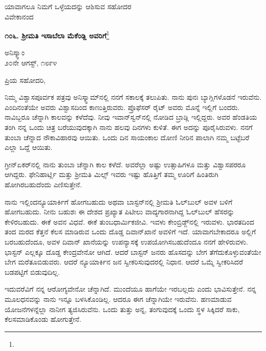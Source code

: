 \vspace{-0.3cm}

{\flushright
ಯಾವಾಗಲೂ ನಿಮಗೆ ಒಳ್ಳೆಯದನ್ನು ಆಶಿಸುವ ಸಹೋದರ\\ವಿವೇಕಾನಂದ\par}

\begin{center}
\textbf{೧೦೬. ಶ‍್ರೀಮತಿ ಇಸಾಬೆಲಾ ಮೆಕೆಂಡ್ಲಿ ಅವರಿಗೆ}\footnote{}
\end{center}

\vspace{-0.5cm}

\begin{flushright}
ಅನಿಸ್ಕ್ವಾಂ\\೨೦ನೇ ಆಗಸ್ಟ್, ೧೮೯೪
\end{flushright}

\vspace{-0.5cm}

\noindent
ಪ್ರಿಯ ಸಹೋದರಿ,

ನಿಮ್ಮ ವಿಶ್ವಾಸಪೂರ್ವಕ ಪತ್ರವು ಅನಿಸ್ಕ್ವಾಮ್‌ನಲ್ಲಿ ನನಗೆ ಸಕಾಲಕ್ಕೆ ತಲುಪಿತು. ನಾನು ಪುನಃ ಬ್ಯಾಗ್ಲಿಗಳೊಡನೆ ಇರುವೆನು. ಎಂದಿನಂತೆಯೇ ಅವರು ವಿಶ್ವಾಸದಿಂದ ಕಾಣುತ್ತಿರುವರು. ಪ್ರೊಫೆಸರ್ ರೈಟ್ ಅವರು ಮೊನ್ನೆ ಇಲ್ಲಿಗೆ ಬಂದರು. ನಾವಿಬ್ಬರೂ ಚೆನ್ನಾಗಿ ಕಾಲವನ್ನು ಕಳೆದೆವು. ನೀವು ಇವಾನ್‌ಸ್ವನ್‌ನಲ್ಲಿ ನೋಡಿದ ಬ್ರಾಡ್ಲಿ ಇಲ್ಲಿದ್ದರು. ಅವರ ಹೆಂಡತಿಯ ತಂಗಿ ನನ್ನ ಒಂದು ಚಿತ್ರ ಬರೆಯುವುದಕ್ಕಾಗಿ ನಾನು ಹಲವು ದಿನಗಳು ಕುಳಿತೆ. ಈಗ ಅದನ್ನು ಪೂರೈಸಿರುವಳು. ನನಗೆ ತುಂಬಾ ಚೆನ್ನಾದ ನೌಕಾವಿಹಾರವು ಆಯಿತು. ಒಂದು ದಿನ ಸಾಯಂಕಾಲ ದೋಣಿ ನೀರಿನ ಪಾಲಾಗಿ ನಮ್ಮ ಬಟ್ಟೆಬರೆ ಎಲ್ಲಾ ಒದ್ದೆ ಆಯಿತು.

ಗ್ರೀನ್‌ಏಕರ್‌ನಲ್ಲಿ ನಾನು ತುಂಬಾ ಚೆನ್ನಾಗಿ ಕಾಲ ಕಳೆದೆ. ಅವರೆಲ್ಲಾ ಅಷ್ಟು ಉತ್ಸಾಹಿಗಳೂ ಮತ್ತು ವಿಶ್ವಾಸಪರರೂ ಆಗಿದ್ದರು. ಫೇನಿಹಾರ್ಟ್ಲಿ ಮತ್ತು ಶ‍್ರೀಮತಿ ಮಿಲ್ಸ್ ಇವರು ಇಷ್ಟು ಹೊತ್ತಿಗೆ ತಮ್ಮ ಊರಿಗೆ ಹಿಂತಿರುಗಿ ಹೋಗಿರಬಹುದೆಂದು ಎಣಿಸುತ್ತೇನೆ.

ನಾನು ಇಲ್ಲಿಂದನ್ಯೂಯಾರ್ಕಿಗೆ ಹೋಗಬಹುದು ಅಥವಾ ಬಾಸ್ಟನ್‌ನಲ್ಲಿ ಶ‍್ರೀಮತಿ ಓಲ್‌ಬುಲ್ ಅವಳ ಬಳಿಗೆ ಹೋಗಬಹುದು. ನೀನು ಬಹುಶಃ ಈ ದೇಶದ ಪ್ರಖ್ಯಾತ ಪಿಟೀಲು ವಾದ್ಯಗಾರನಾಗಿದ್ದ ಓಲ್‌ಬುಲ್ ಹೆಸರನ್ನು ಕೇಳಿರಬಹುದು. ಈಕೆ ಅವನ ವಿಧವೆ. ಈಕೆ ತುಂಬಧಾರ್ಮಿಕಜೀವಿ. ಇವಳು ಕೇಂಬ್ರಿಡ್ಜ್‌ನಲ್ಲಿ ಇರುವಳು. ಭಾರತದಿಂದ ತಂದ ಮರದ ಕೆತ್ತನೆ ಕೆಲಸ ಮಾಡಿರುವ ಒಂದು ದೊಡ್ಡ ದಿವಾನ್‌ಖಾನೆ ಅವಳಿಗೆ ಇದೆ. ಯಾವಾಗಬೇಕಾದರೂ ಅಲ್ಲಿಗೆ ಬರಬಹುದೆಂದೂ, ಅವಳ ದಿವಾನ್ ಖಾನೆಯನ್ನು ಉಪನ್ಯಾಸಕ್ಕೆ ಉಪಯೋಗಿಸಬಹುದೆಂದೂ ನನಗೆ ಹೇಳಿರುವಳು. ಭಾಸ್ಟನ್ ಎಲ್ಲಕ್ಕೂ ದೊಡ್ಡ ಕೇಂದ್ರವೇನೋ ಆಗಿದೆ. ಆದರೆ ಬಾಸ್ಟನ್ ಜನರು ಹೊಸದನ್ನು ಬೇಗ ತೆಗೆದುಕೊಳ್ಳುವಂತೆಯೇ ಬೇಗ ಮರೆತೂಬಿಡುವರು. ಆದರೆ ನ್ಯೂಯಾರ್ಕಿನ ಜನ ಸ್ವೀಕರಿಸುವುದರಲ್ಲಿ ನಿಧಾನ. ಆದರೆ ಒಮ್ಮೆ ಸ್ವೀಕರಿಸಿದರೆ ಬಡಪಟ್ಟಿಗೆ ಬಿಡುವುದಿಲ್ಲ.

ಇದುವರೆವಿಗೆ ನನ್ನ ಆರೋಗ್ಯವೇನೋ ಚೆನ್ನಾಗಿದೆ. ಮುಂದೆಯೂ ಹಾಗೆಯೇ ಇರಬಲ್ಲದು ಎಂದು ಭಾವಿಸುತ್ತೇನೆ. ನನ್ನ ಮೂಲಧನವನ್ನು ನಾನು ಇನ್ನೂ ಬಳಸಿಕೊಂಡಿಲ್ಲ. ಆದರೂ ಈಗ ಚೆನ್ನಾಗಿಯೇ ಇರುವೆನು. ಹಣಮಾಡುವ ಯೋಜನೆಗಳನ್ನೆಲ್ಲಾ ನಾನೀಗ ತ್ಯಜಿಸಿರುವೆನು. ಒಂದು ತುತ್ತು ಅನ್ನ, ತಂಗುವುದಕ್ಕೆ ಒಂದು ಸ್ಥಳ ಸಿಕ್ಕಿದರೆ ಸಾಕು, ಕೆಲಸಮಾಡಿಕೊಂಡು ಹೋಗುತ್ತೇನೆ.

